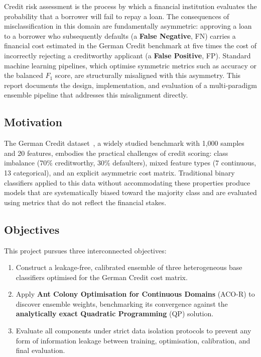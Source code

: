 \documentclass[12pt,a4paper]{article}
\begin{document}
Credit risk assessment is the process by which a financial institution evaluates the probability that a borrower will fail to repay a loan. The consequences of misclassification in this domain are fundamentally asymmetric: approving a loan to a borrower who subsequently defaults (a \textbf{False Negative}, FN) carries a financial cost estimated in the German Credit benchmark at five times the cost of incorrectly rejecting a creditworthy applicant (a \textbf{False Positive}, FP). Standard machine learning pipelines, which optimise symmetric metrics such as accuracy or the balanced $F_1$ score, are structurally misaligned with this asymmetry. This report documents the design, implementation, and evaluation of a multi-paradigm ensemble pipeline that addresses this misalignment directly.

\subsection{Motivation}

The German Credit dataset~\citep{hofmann1994statlog}, a widely studied benchmark with 1,000 samples and 20 features, embodies the practical challenges of credit scoring: class imbalance (70\% creditworthy, 30\% defaulters), mixed feature types (7 continuous, 13 categorical), and an explicit asymmetric cost matrix. Traditional binary classifiers applied to this data without accommodating these properties produce models that are systematically biased toward the majority class and are evaluated using metrics that do not reflect the financial stakes.

\subsection{Objectives}

This project pursues three interconnected objectives:
\begin{enumerate}
    \item Construct a leakage-free, calibrated ensemble of three heterogeneous base classifiers optimised for the German Credit cost matrix.
    \item Apply \textbf{Ant Colony Optimisation for Continuous Domains} (ACO-R) to discover ensemble weights, benchmarking its convergence against the \textbf{analytically exact Quadratic Programming} (QP) solution.
    \item Evaluate all components under strict data isolation protocols to prevent any form of information leakage between training, optimisation, calibration, and final evaluation.
\end{enumerate}
\end{document}
